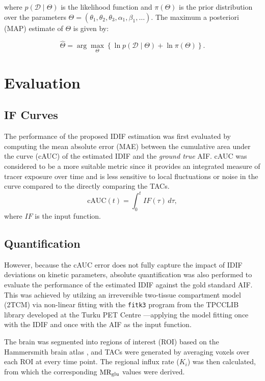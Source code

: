 where \( p(\mathcal{D} \mid \Theta) \) is the likelihood function and \( \pi(\Theta) \) is the prior distribution over the parameters \( \Theta = (\theta_{1}, \theta_{2}, \theta_{3}, \alpha_{1}, \beta_{1}, \dots) \). The maximum a posteriori (MAP) estimate of \( \Theta \) is given by:

\begin{equation}
	\hat{\Theta}
	=
	\arg\max_{\Theta}
	\left\{
	\ln p(\mathcal{D} \mid \Theta)
	+
	\ln \pi(\Theta)
	\right\}.
\end{equation}

\section{Evaluation}
\subsection{IF Curves}
The performance of the proposed IDIF estimation was first evaluated by computing the mean absolute error (MAE) between the cumulative area under the curve (cAUC) of the estimated IDIF and the \textit{ground true} AIF. cAUC was considered to be a more suitable metric since it provides an integrated measure of tracer exposure over time and is less sensitive to local fluctuations or noise in the curve compared to the directly comparing the TACs.
\begin{equation}
	\textrm{cAUC}(t) =  \int_{0}^{t} IF(\tau) \, d\tau,
\end{equation}
where \(IF\) is the input function.

\subsection{Quantification}
However, because the cAUC error does not fully capture the impact of IDIF deviations on kinetic parameters, absolute quantification was also performed to evaluate the performance of the estimated IDIF against the gold standard AIF.
This was achieved by utilzing an irreversible two-tissue compartment model (2TCM) via non-linear fitting with the \texttt{fitk3} program from the TPCCLIB library developed at the Turku PET Centre \cite{oikonen2018tpcclib}—applying the model fitting once with the IDIF and once with the AIF as the input function.

The brain was segmented into regions of interest (ROI) based on the Hammersmith brain atlas \cite{hammers2003three}, and TACs were generated by averaging voxels over each ROI at every time point.
The regional influx rate (\(K_i\)) was then calculated, from which the corresponding \(\text{MR}_{\text{glu}}\) values were derived.

